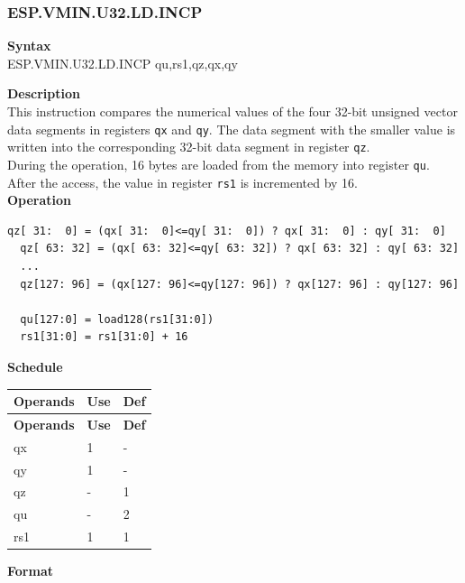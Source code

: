 \newpage
\subsubsection{ESP.VMIN.U32.LD.INCP}\label{instruction:ESPVMINU32LDINCP}
\textbf{Syntax}\\
ESP.VMIN.U32.LD.INCP qu,rs1,qz,qx,qy

\textbf{Description}\\
This instruction compares the numerical values of the four 32-bit unsigned vector data segments in registers \lstinline{qx} and \lstinline{qy}. The data segment with the smaller value is written into the corresponding 32-bit data segment in register \lstinline{qz}.\\During the operation, 16 bytes are loaded from the memory into register \lstinline{qu}. After the access, the value in register \lstinline{rs1} is incremented by 16.\\
\textbf{Operation}
\begin{lstlisting}[escapeinside=`?]
  qz[ 31:  0] = (qx[ 31:  0]<=qy[ 31:  0]) ? qx[ 31:  0] : qy[ 31:  0]
  qz[ 63: 32] = (qx[ 63: 32]<=qy[ 63: 32]) ? qx[ 63: 32] : qy[ 63: 32]
  ...
  qz[127: 96] = (qx[127: 96]<=qy[127: 96]) ? qx[127: 96] : qy[127: 96]

  qu[127:0] = load128(rs1[31:0])
  rs1[31:0] = rs1[31:0] + 16
\end{lstlisting}


\textbf{Schedule}\\
\begin{longtable}[c]{|l|l|l|}
    \hline
    \rowcolor{lightgray}
    \textbf{Operands} & \textbf{Use} & \textbf{Def} \\\hline
    \endfirsthead
    \hline
    \rowcolor{lightgray}
     \textbf{Operands} & \textbf{Use} & \textbf{Def} \\\hline
    \endhead
    \hline
    \endfoot

    qx & 1 & - \\\hline
  qy & 1 & - \\\hline
     qz & - & 1 \\\hline
     qu & - & 2 \\\hline
     rs1 & 1 & 1

\end{longtable}

\textbf{Format}\\

